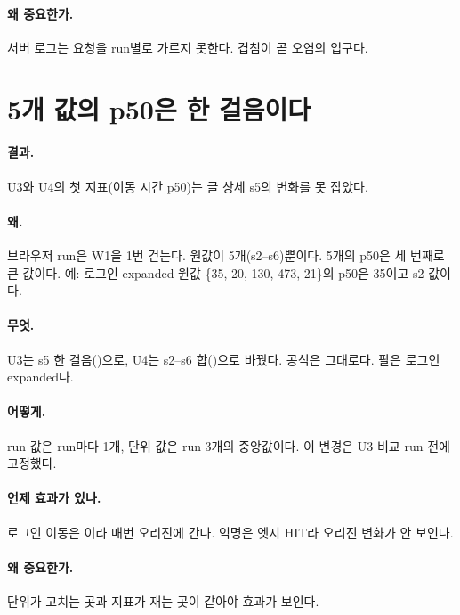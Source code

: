 \paragraph{왜 중요한가.}
서버 로그는 요청을 run별로 가르지 못한다. 겹침이 곧 오염의 입구다.

\section{5개 값의 p50은 한 걸음이다}\label{sec:le-p50}

\paragraph{결과.}
U3와 U4의 첫 지표(이동 시간 p50)는 글 상세 s5의 변화를 못 잡았다.

\paragraph{왜.}
브라우저 run은 W1을 1번 걷는다. \code{[nav]} 원값이 5개(s2--s6)뿐이다.
5개의 p50은 세 번째로 큰 값이다.
예: 로그인 expanded 원값 \{35, 20, 130, 473, 21\}의 p50은 35이고 s2 값이다.

\paragraph{무엇.}
U3는 s5 한 걸음()으로, U4는 s2--s6 합()으로 바꿨다.
공식은 그대로다. 팔은 로그인 expanded다.

\paragraph{어떻게.}
run 값은 run마다 1개, 단위 값은 run 3개의 중앙값이다. 이 변경은 U3 비교 run 전에 고정했다.

\paragraph{언제 효과가 있나.}
로그인 이동은 이라 매번 오리진에 간다. 익명은 엣지 HIT라 오리진 변화가 안 보인다.

\paragraph{왜 중요한가.}
단위가 고치는 곳과 지표가 재는 곳이 같아야 효과가 보인다.

